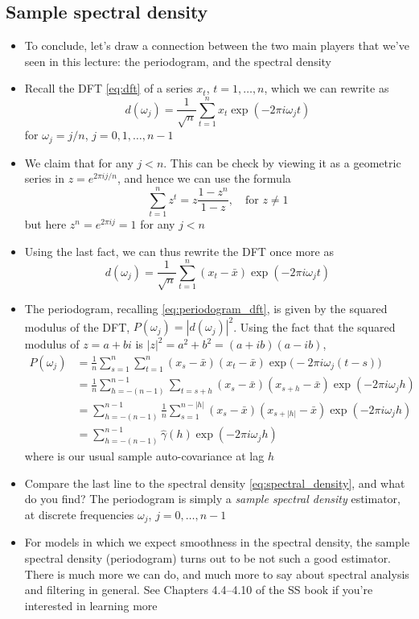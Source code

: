 \documentclass{article}
\begin{document}
\subsection{Sample spectral density}

\begin{itemize}
\item To conclude, let's draw a connection between the two main players that
  we've seen in this lecture: the periodogram, and the spectral density 

\item Recall the DFT \eqref{eq:dft} of a series $x_t$, $t = 1,\dots,n$, which we
  can rewrite as
  \[
  d(\omega_j) = \frac{1}{\sqrt{n}} \sum_{t=1}^n x_t \exp(-2\pi i \omega_j t) 
  \]
  for $\omega_j = j/n$, $j = 0,1,\dots,n-1$

\item We claim that 
  for any $j < n$. This can be check by viewing it as a geometric series
   in $z = e^{2\pi i j / n}$, and hence we can use the
  formula  
  \[
  \sum_{t=1}^n z^t = z \frac{1-z^n}{1-z}, \quad \text{for $z \not= 1$}
  \] 
  but here $z^n = e^{2\pi i j} = 1$ for any $j < n$

\item Using the last fact, we can thus rewrite the DFT once more as  
  \[
  d(\omega_j) = \frac{1}{\sqrt{n}} \sum_{t=1}^n (x_t - \bar{x}) \exp(-2\pi i
  \omega_j t)
  \]

\item The periodogram, recalling \eqref{eq:periodogram_dft}, is given by the 
  squared modulus of the DFT, $P(\omega_j) = |d(\omega_j)|^2$. Using the fact
  that the squared modulus of $z = a+bi$ is $|z|^2 = a^2 + b^2 = (a+ib)(a-ib)$,  
  \begin{align*}
  P(\omega_j) &= \frac{1}{n} \sum_{s=1}^n \sum_{t=1}^n (x_s - \bar{x}) (x_t -
    \bar{x}) \exp\big( -2\pi i \omega_j (t-s) \big) \\
  &= \frac{1}{n} \sum_{h=-(n-1)}^{n-1} \sum_{t = s+h} (x_s - \bar{x}) (x_{s+h} -
    \bar{x}) \exp(-2\pi i \omega_j h) \\
  &= \sum_{h=-(n-1)}^{n-1} \frac{1}{n} \sum_{s=1}^{n-|h|} (x_s - \bar{x})
    (x_{s+|h|} - \bar{x}) \exp(-2\pi i \omega_j h) \\
  &= \sum_{h=-(n-1)}^{n-1} \hat\gamma(h) \exp(-2\pi i \omega_j h)
  \end{align*}
  where  is our usual sample auto-covariance at lag $h$ 

\item Compare the last line to the spectral density \eqref{eq:spectral_density},
  and what do you find? The periodogram is simply a \emph{sample spectral
    density} estimator, at discrete frequencies $\omega_j$, $j = 0,\dots,n-1$ 

\item For models in which we expect smoothness in the spectral density, the
  sample spectral density (periodogram) turns out to be not such a good
  estimator. There is much more we can do, and much more to say about spectral
  analysis and filtering in general. See Chapters 4.4--4.10 of the SS book if
  you're interested in learning more
\end{itemize}
\end{document}
